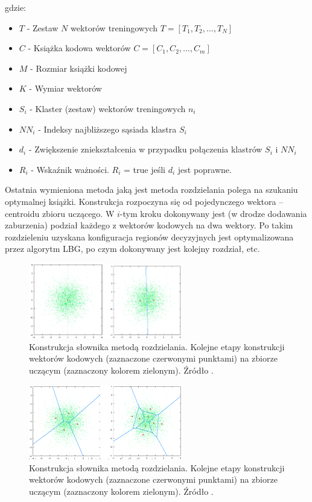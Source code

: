 \documentclass{article}
\begin{document}
gdzie:
\begin{itemize}[label=]
  \item $T$ - Zestaw $N$ wektorów treningowych $T = {[T_{1}, T_{2}, \dots, T_{N}]}$
  \item $C$ - Książka kodowa wektorów $C = {[C_{1}, C_{2}, \dots, C_{m}]}$
  \item $M$ - Rozmiar książki kodowej
  \item $K$ - Wymiar wektorów
  \item $S_{i}$ - Klaster (zestaw) wektorów treningowych $n_{i}$
  \item $NN_{i}$ - Indeksy najbliższego sąsiada klastra $S_{i}$
  \item $d_{i}$ - Zwiększenie zniekształcenia w przypadku połączenia klastrów $S_{i}$ i $NN_{i}$
  \item $R_{i}$ - Wskaźnik ważności. $R_{i}$ = true jeśli $d_{i}$ jest poprawne.
        \cite{tkaukoranta}
\end{itemize}

Ostatnia wymieniona metoda jaką jest metoda rozdzielania polega na szukaniu optymalnej książki.
Konstrukcja rozpoczyna się od pojedynczego wektora – centroidu zbioru uczącego.
W $i$-tym kroku dokonywany jest (w drodze dodawania zaburzenia) podział każdego z wektorów kodowych na dwa wektory.
Po takim rozdzieleniu uzyskana konfiguracja regionów decyzyjnych jest optymalizowana przez algorytm LBG, po czym dokonywany jest kolejny rozdział, etc.

\begin{figure}[H]
  \centering
  \includegraphics[width=0.6\textwidth]{images/rodzielania_1.png}
  \caption{Konstrukcja słownika metodą rozdzielania. Kolejne etapy konstrukcji wektorów kodowych
    (zaznaczone czerwonymi punktami) na zbiorze uczącym (zaznaczony kolorem zielonym). Źródło \cite{mwilczewski}.}
  \label{fig:rozdzielania_1}
\end{figure}

\begin{figure}[H]
  \centering
  \includegraphics[width=0.6\textwidth]{images/rodzielania_2.png}
  \caption{Konstrukcja słownika metodą rozdzielania. Kolejne etapy konstrukcji wektorów kodowych
    (zaznaczone czerwonymi punktami) na zbiorze uczącym (zaznaczony kolorem zielonym). Źródło \cite{mwilczewski}.}
  \label{fig:rozdzielania_2}
\end{figure}
\end{document}
